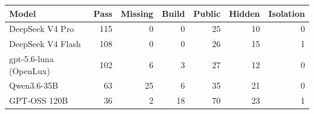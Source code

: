 \begin{tabular}{lrrrrrr}
\toprule
\textbf{Model} & \textbf{Pass} & \textbf{Missing} & \textbf{Build}
  & \textbf{Public} & \textbf{Hidden} & \textbf{Isolation} \\
\midrule
DeepSeek V4 Pro & 115 & 0 & 0 & 25 & 10 & 0 \\
DeepSeek V4 Flash & 108 & 0 & 0 & 26 & 15 & 1 \\
gpt-5.6-luna (OpenLux) & 102 & 6 & 3 & 27 & 12 & 0 \\
Qwen3.6-35B & 63 & 25 & 6 & 35 & 21 & 0 \\
GPT-OSS 120B & 36 & 2 & 18 & 70 & 23 & 1 \\
\bottomrule
\end{tabular}
